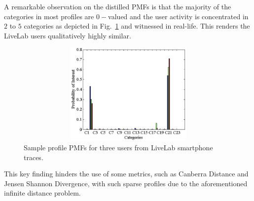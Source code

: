 \documentclass[conference]{IEEEtran}
\theoremstyle{definition}
\begin{document}
A remarkable observation on the distilled PMFs is that the majority
of the categories in most profiles are $0-$valued and the user activity 
is concentrated in $2$ to $5$ categories as
depicted in Fig.~\ref{fig:SampleProfile} and witnessed in real-life.
This renders the LiveLab users \textquotedbl{}qualitatively\textquotedbl{} highly
similar. 
\begin{figure}[!tp]
\centering
  \includegraphics[width=11.5cm,height=5cm]{User2.eps} 
  \caption{Sample profile PMFs for three users from LiveLab smartphone traces.} 
       \label{fig:SampleProfile}
\end{figure}
 This key finding hinders the use of some metrics, such as Canberra
Distance and Jensen Shannon Divergence, with such sparse profiles due to the 
aforementioned infinite distance problem. 
\end{document}
